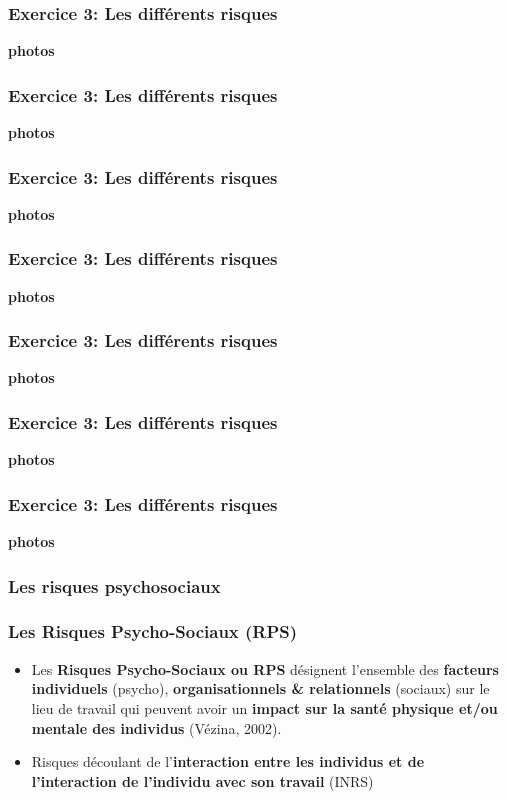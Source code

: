 \documentclass{beamer}
\begin{document}
\begin{frame}
\frametitle{Exercice 3: Les différents risques}

\textbf{photos}
\end{frame}

\begin{frame}
\frametitle{Exercice 3: Les différents risques}

\textbf{photos}
\end{frame}

\begin{frame}
\frametitle{Exercice 3: Les différents risques}

\textbf{photos}
\end{frame}

\begin{frame}
\frametitle{Exercice 3: Les différents risques}

\textbf{photos}
\end{frame}

\begin{frame}
\frametitle{Exercice 3: Les différents risques}

\textbf{photos}
\end{frame}

\begin{frame}
\frametitle{Exercice 3: Les différents risques}

\textbf{photos}
\end{frame}

\begin{frame}
\frametitle{Exercice 3: Les différents risques}

\textbf{photos}
\end{frame}

\begin{frame}
\frametitle{Les risques psychosociaux}

\end{frame}

\begin{frame}
\frametitle{Les Risques Psycho-Sociaux (RPS)}
\begin{itemize}
\item Les \textbf{Risques Psycho-Sociaux ou RPS} désignent l’ensemble des \textbf{facteurs individuels} (psycho), \textbf{organisationnels & relationnels} (sociaux) sur le lieu de travail qui peuvent avoir un \textbf{impact sur la santé physique et/ou mentale des individus} (Vézina, 2002).

\item Risques découlant de l’\textbf{interaction entre les individus et de l’interaction de l’individu avec son travail} (INRS)
\end{itemize}
\end{frame}
\end{document}
